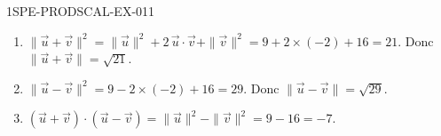 \begin{corrige}{1SPE-PRODSCAL-EX-011}
\begin{enumerate}
\item $\|\vec{u} + \vec{v}\|^2 = \|\vec{u}\|^2 + 2\,\vec{u} \cdot \vec{v} + \|\vec{v}\|^2 = 9 + 2 \times (-2) + 16 = 21$. Donc $\|\vec{u} + \vec{v}\| = \sqrt{21}$.
\item $\|\vec{u} - \vec{v}\|^2 = 9 - 2 \times (-2) + 16 = 29$. Donc $\|\vec{u} - \vec{v}\| = \sqrt{29}$.
\item $(\vec{u} + \vec{v}) \cdot (\vec{u} - \vec{v}) = \|\vec{u}\|^2 - \|\vec{v}\|^2 = 9 - 16 = -7$.
\end{enumerate}
\end{corrige}
